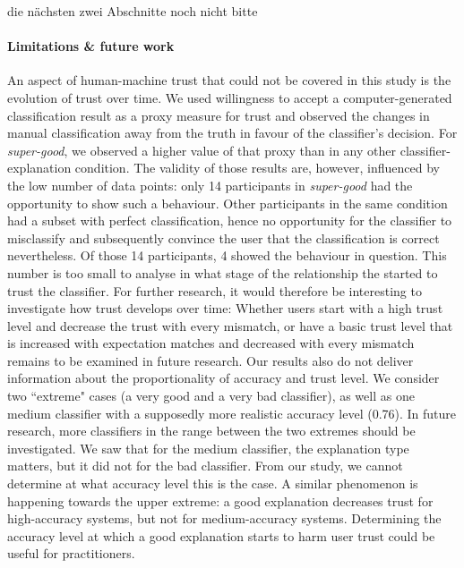 {\color{blue} die nächsten zwei Abschnitte noch nicht bitte}
\paragraph{Limitations \& future work}
An aspect of human-machine trust that could not be covered in this study is the evolution of trust over time. We used willingness to accept a computer-generated classification result as a proxy measure for trust and observed the changes in manual classification away from the truth in favour of the classifier's decision. For \textit{super-good}, we observed a higher value of that proxy than in any other classifier-explanation condition. The validity of those results are, however, influenced by the low number of data points: only 14 participants in \textit{super-good} had the opportunity to show such a behaviour. Other participants in the same condition had a subset with perfect classification, hence no opportunity for the classifier to misclassify and subsequently convince the user that the classification is correct nevertheless. Of those 14 participants, 4 showed the behaviour in question. This number is too small to analyse in what stage of the relationship the started to trust the classifier. For further research, it would therefore be interesting to investigate how trust develops over time: Whether users start with a high trust level and decrease the trust with every mismatch, or have a basic trust level that is increased with expectation matches and decreased with every mismatch remains to be examined in future research.\newline
Our results also do not deliver information about the proportionality of accuracy and trust level. We consider two ``extreme" cases (a very good and a very bad classifier), as well as one medium classifier with a supposedly more realistic accuracy level (0.76). In future research, more classifiers in the range between the two extremes should be investigated. We saw that for the medium classifier, the explanation type matters, but it did not for the bad classifier. From our study, we cannot determine at what accuracy level this is the case. A similar phenomenon is happening towards the upper extreme: a good explanation decreases trust for high-accuracy systems, but not for medium-accuracy systems. Determining the accuracy level at which a good explanation starts to harm user trust could be useful for practitioners.\newline
